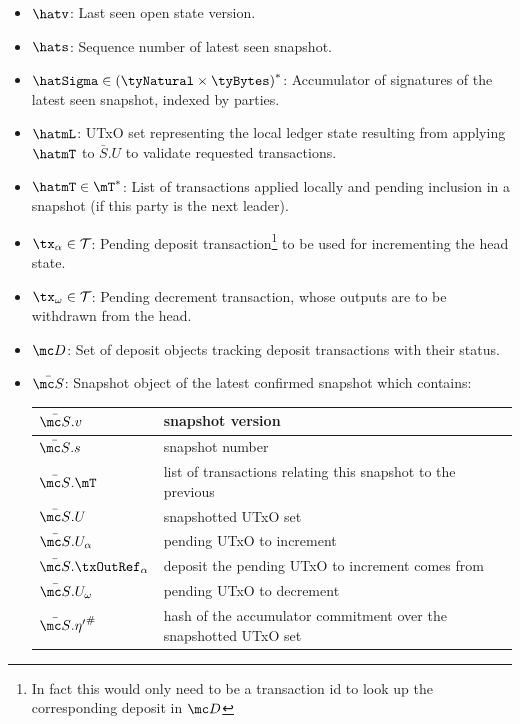 \begin{itemize}
	\item $\hatv$: Last seen open state version.
	\item $\hats$: Sequence number of latest seen snapshot.
	\item $\hatSigma \in {(\tyNatural \times \tyBytes)}^{*}$: Accumulator of
	      signatures of the latest seen snapshot, indexed by parties.
	\item $\hatmL$: UTxO set representing the local ledger state resulting from
	      applying $\hatmT$ to $\bar{S}.U$ to validate requested transactions.
	\item $\hatmT \in \mT^{*}$: List of transactions applied locally and pending
	      inclusion in a snapshot (if this party is the next leader).
	\item $\tx_\alpha \in \mathcal{T}$: Pending deposit transaction\footnote{In
		      fact this would only need to be a transaction id to look up the
		      corresponding deposit in $\mc D$} to be used for incrementing the head
	      state.
	\item $\tx_\omega \in \mathcal{T}$: Pending decrement transaction, whose outputs are to be
	      withdrawn from the head.
	\item $\mc D$: Set of deposit objects tracking deposit transactions with their
	      status.
	\item $\bar{\mc S}$: Snapshot object of the latest confirmed snapshot which
	      contains:
	      \begin{center}
		      \begin{tabular}{|l|l|}\hline
			      $\bar{\mc S}.v$        & snapshot version                                            \\ \hline
			      $\bar{\mc S}.s$        & snapshot number                                             \\ \hline
			      $\bar{\mc S}.\mT$      & list of transactions relating this snapshot to the previous \\ \hline
			      $\bar{\mc S}.U$        & snapshotted UTxO set                                        \\ \hline
			      $\bar{\mc S}.U_\alpha$ & pending UTxO to increment                                   \\ \hline
			      $\bar{\mc S}.\txOutRef_\alpha$ & deposit the pending UTxO to increment comes from    \\ \hline
			      $\bar{\mc S}.U_\omega$           & pending UTxO to decrement                                        \\ \hline
			      $\bar{\mc S}.{\eta'}^{\#}$       & hash of the accumulator commitment over the snapshotted UTxO set \\ \hline
		      \end{tabular}
	      \end{center}
\end{itemize}

